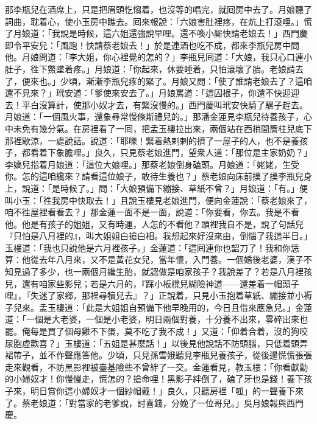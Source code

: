 那李瓶兒在酒席上，只是把眉頭忔㥮着，{}也沒等的唱完，就囘房中去了。月娘聽了詞曲，耽着心，使小玉房中瞧去。囘來報說：「六娘害肚裡疼，在炕上打滾哩。」慌了月娘道：「我說是時候，這六姐還強說早哩。還不喚小厮快請老娘去！」西門慶即令平安兒：「風跑！快請蔡老娘去！」於是連酒也吃不成，都來李瓶兒房中問他。月娘問道：「李大姐，你心裡覺的怎的？」李瓶兒囘道：「大娘，我只心口連小肚子，徃下鱉墜着疼。」月娘道：「你起來，休要睡着，只怕滾壞了胎。老娘請去了，便來也。」少頃，漸漸李瓶兒疼的緊了。月娘又問：「使了誰請老娘去了？這咱還不見來？」玳安道：「爹使來安去了。」月娘罵道：「這囚根子，你還不快迎迎去！平白沒算計，使那小奴才去，有緊沒慢的。」{}西門慶叫玳安快騎了騾子趕去。月娘道：「一個風火事，還象尋常慢條斯禮兒的。」那潘金蓮見李瓶兒待養孩子，心中未免有幾分氣。在房裡看了一囘，把孟玉樓拉出來，兩個站在西梢間簷柱兒底下那裡歇涼，一處說話。說道：「耶嚛！緊着熱剌剌的擠了一屋子的人，也不是養孩子，都看着下象膽哩。」良久，只見蔡老娘進門，望衆人道：「那位是主家奶奶？」李嬌兒指着月娘道：「這位大娘哩。」那蔡老娘倒身磕頭。月娘道：「姥姥，生受你。怎的這咱纔來？請看這位娘子，敢待生養也？」蔡老娘向床前摸了摸李瓶兒身上，說道：「是時候了。」問：「大娘預備下繃接、草紙不曾？」月娘道：「有。」{}便叫小玉：「徃我房中快取去！」{}且說玉樓見老娘進門，便向金蓮說：「蔡老娘來了，咱不徃屋裡看看去？」那金蓮一面不是一面，說道：「你要看，你去。我是不看他。他是有孩子的姐姐，又有時運，人怎的不看他？頭裡我自不是，說了句話兒『只怕是八月裡的』，叫大姐姐白搶白相。我想起來好沒來由，倒惱了我這半日。」玉樓道：「我也只說他是六月裡孩子。」金蓮道：「這囘連你也韶刀了！我和你恁算：他從去年八月來，又不是黃花女兒，當年懷，入門養。一個婚後老婆，漢子不知見過了多少，也一兩個月纔生胎，就認做是咱家孩子？我說差了？若是八月裡孩兒，還有咱家些影兒；若是六月的，『踩小板櫈兒糊險神道——還差着一帽頭子哩』，『失迷了家鄉，那裡尋犢兒去』？」{}正說着，只見小玉抱着草紙、繃接並小褥子兒來。孟玉樓道：「此是大姐姐自預備下他早晚用的，今日且借來應急兒。」{}金蓮道：「一個是大老婆，一個是小老婆，明日兩個對養，十分養不出來，零碎出來也罷。俺每是買了個母雞不下蛋，莫不吃了我不成！」{}又道：「仰着合着，沒的狗咬尿胞虛歡喜？」玉樓道：「五姐是甚麼話！」以後見他說話不防頭腦，只低着頭弄裙帶子，{}並不作聲應答他。少頃，只見孫雪娥聽見李瓶兒養孩子，從後邊慌慌張張走來觀看，不防黑影裡被臺基險些不曾絆了一交。金蓮看見，教玉樓：「你看獻勤的小婦奴才！你慢慢走，慌怎的？搶命哩！黑影子絆倒了，磕了牙也是錢！養下孩子來，明日賞你這小婦奴才一個紗帽戴！」{}良久，只聽房裡「呱」的一聲養下來了。{}蔡老娘道：「對當家的老爹說，討喜錢，分娩了一位哥兒。」吳月娘報與西門慶。

